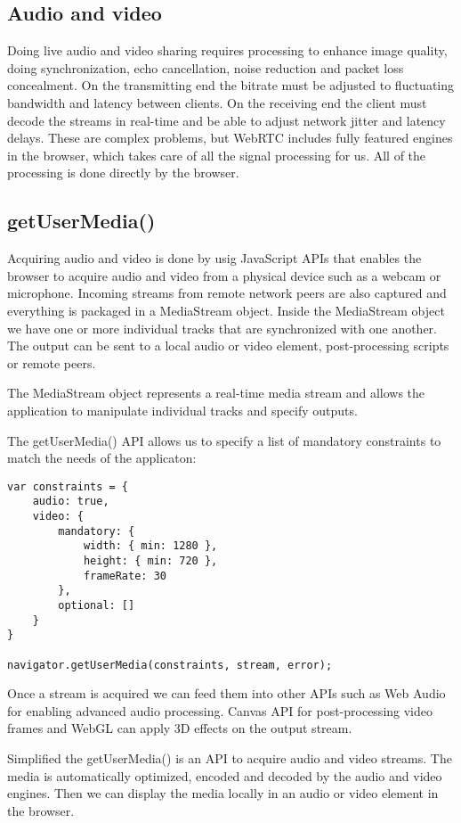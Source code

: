\subsection{Audio and video}
Doing live audio and video sharing requires processing to enhance image quality, doing synchronization, echo cancellation, noise reduction and packet loss concealment\cite{Grigorik2013High}. On the transmitting end the bitrate must be adjusted to fluctuating bandwidth and latency between clients. On the receiving end the client must decode the streams in real-time and be able to adjust network jitter and latency delays. These are complex problems, but WebRTC includes fully featured engines in the browser, which takes care of all the signal processing for us. All of the processing is done directly by the browser.

\subsection{getUserMedia()}
Acquiring audio and video is done by usig JavaScript APIs that enables the browser to acquire audio and video from a physical device such as a webcam or microphone. Incoming streams from remote network peers are also captured and everything is packaged in a MediaStream object. Inside the MediaStream object we have one or more individual tracks that are synchronized with one another. The output can be sent to a local audio or video element, post-processing scripts or remote peers.

The MediaStream object represents a real-time media stream and allows the application to manipulate individual tracks and specify outputs.


The getUserMedia() API allows us to specify a list of mandatory constraints to match the needs of the applicaton:

\lstset{language=Javascript} 
\begin{lstlisting}
var constraints = {
	audio: true,
	video: {
		mandatory: {
			width: { min: 1280 },
			height: { min: 720 },
			frameRate: 30
		},
		optional: []
	}
}

navigator.getUserMedia(constraints, stream, error);
\end{lstlisting}

Once a stream is acquired we can feed them into other APIs such as Web Audio for enabling advanced audio processing. Canvas API for post-processing video frames and WebGL can apply 3D effects on the output stream.

Simplified the getUserMedia() is an API to acquire audio and video streams. The media is automatically optimized, encoded and decoded by the audio and video engines. Then we can display the media locally in an audio or video element in the browser.


